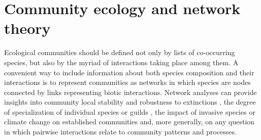 \section{Community ecology and network theory}
Ecological communities should be defined not only by lists of co-occurring species, but also by the myriad of interactions taking place among them. A convenient way to include information about both species composition and their interactions is to represent communities as networks in which species are nodes connected by links representing biotic interactions. Network analyses can provide insights into community local stability \citep{Allesina2012} and robustness to extinctions \citep{Riede2011a}, the degree of specialization of individual species or guilds \citep{Dorado2011}, the impact of invasive species or climate change on established communities \citep{Lopezaraiza-Mikel2007} and, more generally, on any question in which pairwise interactions relate to community patterns and processes.

